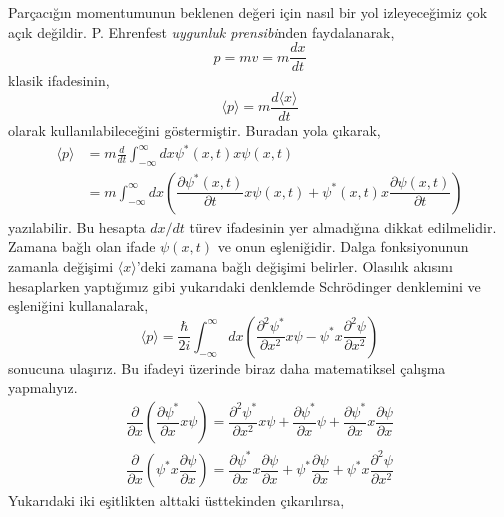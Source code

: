 \documentclass[a4paper,12pt, twoside]{article}
\begin{document}
Parçacığın momentumunun beklenen değeri için nasıl bir yol izleyeceğimiz çok açık değildir. P. Ehrenfest \emph{uygunluk prensibi}nden faydalanarak,
\begin{equation*}
p = m v = m\frac{dx}{dt}
\end{equation*}
klasik ifadesinin,
\begin{equation*}
\langle p \rangle = m\frac{d \langle x \rangle}{dt}
\end{equation*}
olarak kullanılabileceğini göstermiştir. Buradan yola çıkarak,
\begin{align}
\langle p \rangle &= m \frac{d}{dt} \int ^{\infty }_{-\infty }dx \psi^{\ast }\left(x,t\right) x \psi \left( x,t\right)\\
&=m\int ^{\infty }_{-\infty }dx\left( \dfrac {\partial \psi ^{\ast }\left( x,t\right) }{\partial t}x\psi \left( x,t\right) +\psi ^{\ast }\left( x,t\right) x \dfrac {\partial \psi \left( x,t\right) }{\partial t}\right) \nonumber 
\end{align}
yazılabilir. Bu hesapta $dx/dt$ türev ifadesinin yer almadığına dikkat edilmelidir. Zamana bağlı olan ifade $\psi(x,t)$ ve onun eşleniğidir. Dalga fonksiyonunun zamanla değişimi $\langle x \rangle$'deki zamana bağlı değişimi belirler. Olasılık akısını hesaplarken yaptığımız gibi yukarıdaki denklemde Schrödinger denklemini ve eşleniğini kullanalarak,
\begin{equation}
\langle p\rangle =\dfrac {\hbar }{2i}\int ^{\infty }_{-\infty }dx\left( \dfrac {\partial ^{2}\psi ^{\ast }}{\partial x^{2}}x\psi -\psi ^{\ast }x\dfrac {\partial ^{2}\psi }{\partial x^{2}}\right)
\label{eq:expectation_val_p_1}
\end{equation}
sonucuna ulaşırız. Bu ifadeyi üzerinde biraz daha matematiksel çalışma yapmalıyız.
\begin{align*}
\dfrac {\partial }{\partial x}\left( \dfrac {\partial \psi ^{\ast }}{\partial x}x\psi \right) =\dfrac {\partial ^{2}\psi^{\ast }}{\partial x^{2}}x\psi +\dfrac {\partial \psi ^{\ast }}{\partial x}\psi +\dfrac {\partial \psi ^{\ast }}{\partial x}x\dfrac {\partial \psi }{\partial x} \\
\dfrac {\partial }{\partial x}\left( \psi ^{\ast }x\dfrac {\partial \psi }{\partial x}\right) =\dfrac {\partial \psi ^{\ast }}{\partial x}x\dfrac {\partial \psi }{\partial x}+\psi ^{\ast }\dfrac {\partial \psi }{\partial x} + \psi ^{\ast } x \dfrac {\partial ^{2}\psi }{\partial x^{2}}
\end{align*}
Yukarıdaki iki eşitlikten alttaki üsttekinden çıkarılırsa,
\end{document}
